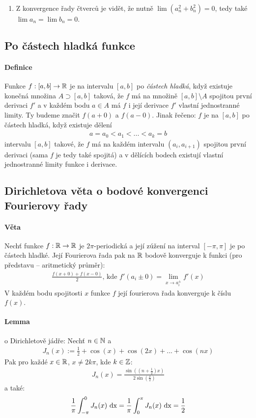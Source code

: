 \documentclass[a4paper,10pt]{article}
\begin{document}
\begin{enumerate}
	\item Z konvergence řady čtverců je vidět, že nutně $\lim (a_n^2 + b_n^2) =
	0$, tedy také $\lim a_n = \lim b_n = 0$.
\end{enumerate}


\subsection{Po částech hladká funkce}
\label{po-castech-hladka-funkce}
\setcounter{equation}{0}
\paragraph{Definice}
Funkce $f:[a,b] \to \mathbb{R}$ je na intervalu $[a,b]$ po \textit{částech hladká}, když
existuje konečná množina $A \supset [a,b]$ taková, že $f$ má na množině $[a,b]
\setminus A$ spojitou první derivaci $f'$ a v každém bodu $a \in A$ má $f$ i
její derivace $f'$ vlastní jednostranné limity. Ty budeme značit $f(a+0)$ a
$f(a-0)$.
Jinak řečeno: $f$ je na $[a,b]$ po částech hladká, když existuje dělení
\begin{align}
	a = a_0 < a_1 < ... < a_k = b
\end{align}
intervalu $[a,b]$ takové, že $f$ má na každém intervalu $(a_i, a_{i+1})$
spojitou první derivaci (sama $f$ je tedy také spojitá) a v dělících bodech
existují vlastní jednostranné limity funkce i derivace.


\subsection{Dirichletova věta o bodové konvergenci Fourierovy řady}
\label{dirichlet}
\setcounter{equation}{0}
\paragraph{Věta}
Nechť funkce $f: \mathbb{R} \to \mathbb{R}$ je $2\pi$-periodická a její zúžení na interval
$[-\pi,\pi]$ je po částech hladké. Její Fourierova řada pak na $\mathbb{R}$ bodově
konverguje k funkci (pro představu -- aritmetický průměr):
\begin{align*}
	\frac{f(x+0) + f(x-0)}{2} \text{, kde~} f'(a_i \pm 0) = \lim_{x \to a_i^\pm} f'(x)
\end{align*}
V každém bodu spojitosti $x$ funkce $f$ její fourierova řada konverguje k číslu
$f(x)$.
\paragraph{Lemma}
o Dirichletově jádře: Nechť $n \in \mathbb{N}$ a 
\begin{align*}
	J_n(x) := \frac{1}{2} + \cos(x) + \cos(2x) + ... + \cos(nx)
\end{align*}
Pak pro každé $x\in\mathbb{R}$, $x \neq 2k\pi$, kde $k \in \mathbb{Z}$:
\begin{align*}
	J_n(x) = \frac{\sin((n+\frac{1}{2})x)}{2\sin(
	\frac{x}{2})}
\end{align*}
a také:
\begin{align*}
	\frac{1}{\pi} \int_{-\pi}^0 J_n(x) \operatorname*{\,dx} = \frac{1}{\pi}\int_0^\pi J_n(x)\operatorname*{\,dx} =
	\frac{1}{2}
\end{align*}
\end{document}
